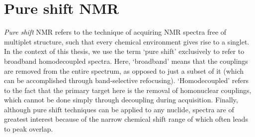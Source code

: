 \chapter{Pure shift NMR}
\label{chpt:pureshift}

\textit{Pure shift} NMR refers to the technique of acquiring NMR spectra free of multiplet structure, such that every chemical environment gives rise to a singlet.\autocite{Zangger2015PNMRS,Castanar2017MRC}
In the context of this thesis, we use the term `pure shift' exclusively to refer to broadband homodecoupled \proton{} spectra.
Here, `broadband' means that the couplings are removed from the entire spectrum, as opposed to just a subset of it (which can be accomplished through band-selective refocusing).
`Homodecoupled' refers to the fact that the primary target here is the removal of homonuclear couplings, which cannot be done simply through decoupling during acquisition.
Finally, although pure shift techniques can be applied to any nuclide, \proton{} spectra are of greatest interest because of the narrow chemical shift range of \proton{} which often leads to peak overlap.









\printbibliography[heading=subbibnumbered]{}
